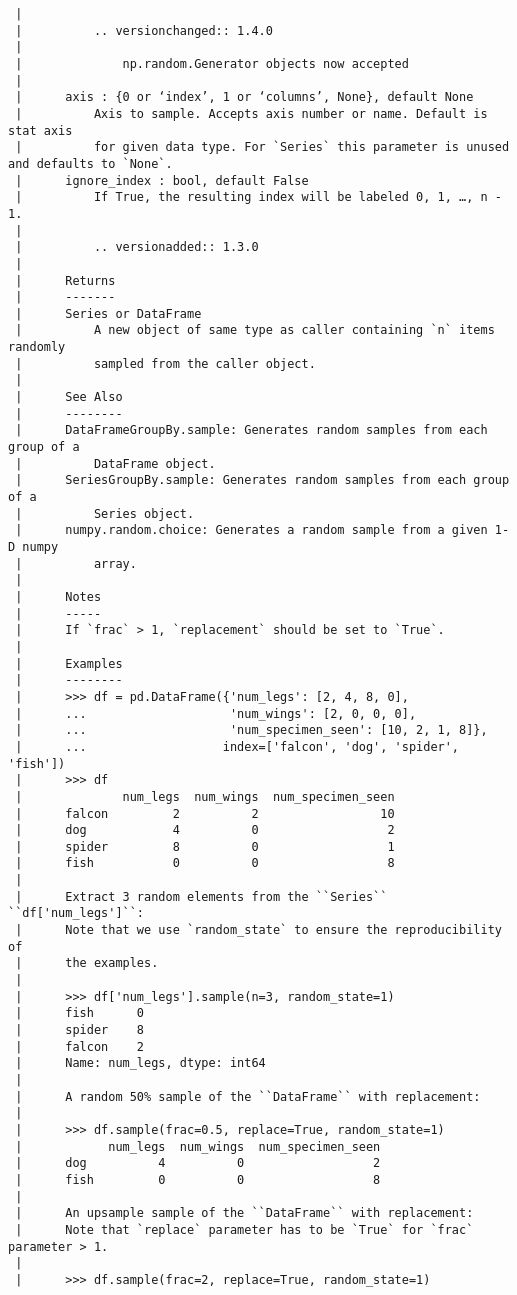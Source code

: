 \documentclass[
  letterpaper,
  DIV=11,
  numbers=noendperiod]{scrreprt}
\begin{document}
\begin{verbatim}
 |      
 |          .. versionchanged:: 1.4.0
 |      
 |              np.random.Generator objects now accepted
 |      
 |      axis : {0 or ‘index’, 1 or ‘columns’, None}, default None
 |          Axis to sample. Accepts axis number or name. Default is stat axis
 |          for given data type. For `Series` this parameter is unused and defaults to `None`.
 |      ignore_index : bool, default False
 |          If True, the resulting index will be labeled 0, 1, …, n - 1.
 |      
 |          .. versionadded:: 1.3.0
 |      
 |      Returns
 |      -------
 |      Series or DataFrame
 |          A new object of same type as caller containing `n` items randomly
 |          sampled from the caller object.
 |      
 |      See Also
 |      --------
 |      DataFrameGroupBy.sample: Generates random samples from each group of a
 |          DataFrame object.
 |      SeriesGroupBy.sample: Generates random samples from each group of a
 |          Series object.
 |      numpy.random.choice: Generates a random sample from a given 1-D numpy
 |          array.
 |      
 |      Notes
 |      -----
 |      If `frac` > 1, `replacement` should be set to `True`.
 |      
 |      Examples
 |      --------
 |      >>> df = pd.DataFrame({'num_legs': [2, 4, 8, 0],
 |      ...                    'num_wings': [2, 0, 0, 0],
 |      ...                    'num_specimen_seen': [10, 2, 1, 8]},
 |      ...                   index=['falcon', 'dog', 'spider', 'fish'])
 |      >>> df
 |              num_legs  num_wings  num_specimen_seen
 |      falcon         2          2                 10
 |      dog            4          0                  2
 |      spider         8          0                  1
 |      fish           0          0                  8
 |      
 |      Extract 3 random elements from the ``Series`` ``df['num_legs']``:
 |      Note that we use `random_state` to ensure the reproducibility of
 |      the examples.
 |      
 |      >>> df['num_legs'].sample(n=3, random_state=1)
 |      fish      0
 |      spider    8
 |      falcon    2
 |      Name: num_legs, dtype: int64
 |      
 |      A random 50% sample of the ``DataFrame`` with replacement:
 |      
 |      >>> df.sample(frac=0.5, replace=True, random_state=1)
 |            num_legs  num_wings  num_specimen_seen
 |      dog          4          0                  2
 |      fish         0          0                  8
 |      
 |      An upsample sample of the ``DataFrame`` with replacement:
 |      Note that `replace` parameter has to be `True` for `frac` parameter > 1.
 |      
 |      >>> df.sample(frac=2, replace=True, random_state=1)

\end{verbatim}
\end{document}
